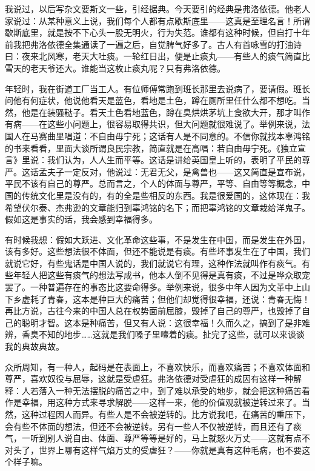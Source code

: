 我说过，以后写杂文要斯文一些，引经据典。今天要引的经典是弗洛依德。他老人家说过：从某种意义上说，我们每个人都有点歇斯底里——这真是至理名言！所谓歇斯底里，就是按不下心头一股无明火，行为失范。谁都有这种时候，但自打十年前我把弗洛依德全集通读了一遍之后，自觉脾气好多了。古人有首咏雪的打油诗曰：夜来北风寒，老天大吐痰。一轮红日出，便是止痰丸——有些人的痰气简直比雪天的老天爷还大。谁能当这枚止痰丸呢？只有弗洛依德。 

年轻时，我在街道工厂当工人。有位师傅常跑到班长那里去说病了，要请假。班长问他有何症状，他说他看天是蓝色，看地是土色，蹲在厕所里任什么都不想吃。当然，他是在装骚鞑子。看天土色看地蓝色，蹲在臭烘烘茅坑上食欲大开，那才叫作有病——在这些小问题上，很容易取得共识，但大问题就很难说了。举例来说，法国人在马赛曲里唱道：不自由毋宁死；这话有人是不同意的。不信你就找本辜鸿铭的书来看看，里面大谈所谓良民宗教，简直就是在高唱：若自由毋宁死。《独立宣言》里说：我们认为，人人生而平等。这话是讲给英国皇上听的，表明了平民的尊严。这话孟夫子一定反对，他说过：无君无父，是禽兽也——这又简直是宣布说，平民不该有自己的尊严。总而言之，个人的体面与尊严，平等、自由等等概念，中国的传统文化里是没有的，有的全是些相反的东西。我是很爱国的，这体现在：我希望伏尔泰、杰弗逊的文章能归到辜鸿铭的名下；而把辜鸿铭的文章栽给洋鬼子。假如这是事实的话，我会感到幸福得多。 

有时候我想：假如大跃进、文化革命这些事，不是发生在中国，而是发生在外国，该有多好。这些想法很不体面，但还不能说是有痰。有些坏事发生在了中国，我们就说它好，有些鬼话是中国人说的，我们就说它有理，这种作法就叫作有痰气。有些年轻人把这些有痰气的想法写成书，他本人倒不见得是真有痰，不过是哗众取宠罢了。一种普遍存在的事态比这要命得多。举例来说，很多中年人因为文革中上山下乡虚耗了青春，这本是种巨大的痛苦；但他们却觉得很幸福，还说：青春无悔！再比方说，古往今来的中国人总在权势面前屈膝，毁掉了自己的尊严，也毁掉了自己的聪明才智。这本是种痛苦，但又有人说：这很幸福！久而久之，搞到了是非难辨，香臭不知的地步……这就是我们嗓子里噎着的痰。扯完了这些，就可以来谈谈我的典故典故。 

众所周知，有一种人，起码是在表面上，不喜欢快乐，而喜欢痛苦；不喜欢体面和尊严，喜欢奴役与屈辱，这就是受虐狂。弗洛依德对受虐狂的成因有这样一种解释：人若落入一种无法摆脱的痛苦之中，到了难以承受的地步，就会把这种痛苦看作是幸福，用这种方式来寻求解脱——这样一来，他的价值观就被逆转过来了。当然，这种过程因人而异。有些人是不会被逆转的。比方说我吧，在痛苦的重压下，会有些不体面的想法，但还不会被逆转。另有一些人不仅被逆转，而且还有了痰气，一听到别人说自由、体面、尊严等等是好的，马上就怒火万丈——这就有点不对头了，世界上哪有这样气焰万丈的受虐狂？——你就是真有这种毛病，也不要这个样子嘛。

